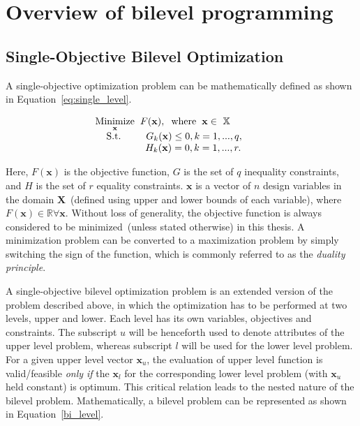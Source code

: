 \chapter{Overview of bilevel programming}
\label{chapter:2}


\section{Single-Objective Bilevel Optimization}
\label{sing_obj_bilevel_lite}

A single-objective optimization problem can be mathematically defined as shown in Equation~\ref{eq:single_level}.

\begin{equation}
\begin{array}{lr}
\underset{\mathbf{x}}{\text{Minimize}}\hspace{2mm} F(\mathbf{x}), \hspace{2mm} \text{where}\hspace{2mm}{\mathbf{x} \in \ \mathbb{X}}\\
  \hspace{4mm}\text{S.t.}\hspace{9mm}G_k(\mathbf{x}) \le 0, k=1,...,q, \hspace{9mm}\\
\hspace{18mm}H_k(\mathbf{x}) = 0, k=1,...,r.\hspace{1mm}\\
\end{array}
\label{eq:single_level}
\end{equation}

Here, $F(\mathbf{x})$ is the objective function, $G$ is the set of $q$ inequality constraints, and $H$ is the set of $r$ equality constraints.  $\mathbf{x}$ is a vector of $n$ design variables in the domain $\mathbf{X}$~(defined using upper and lower bounds of each variable), where $F(\mathbf{x}) \in \mathbb{R} \forall \mathbf{x}$. Without loss of generality, the objective function is always considered to be minimized~(unless stated otherwise) in this thesis. A minimization problem can be converted to a maximization problem by simply switching the sign of the function, which is commonly referred to as the \textit{duality principle}. 

A single-objective bilevel optimization problem is an extended version of the problem described above, in which the optimization has to be performed at two levels, upper and lower. Each level has its own variables, objectives and constraints. The subscript $u$ will be henceforth used to denote attributes of the upper level problem, whereas subscript $l$ will be used for the lower level problem. For a given upper level vector $\mathbf{x}_u$, the evaluation of upper level function is valid/feasible \textit{only if} the $\mathbf{x}_l$ for the corresponding lower level problem (with $\mathbf{x}_u$ held constant) is optimum. This critical relation leads to the nested nature of the bilevel problem. Mathematically, a bilevel problem can be represented as shown in Equation~\ref{bi_level}.



